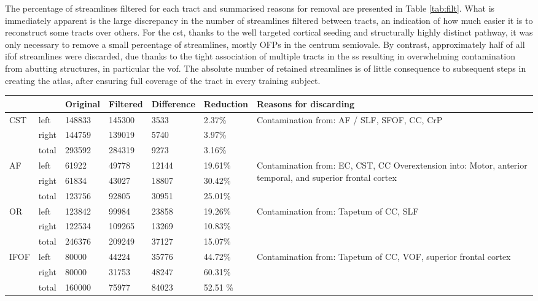 The percentage of streamlines filtered for each tract and summarised reasons for removal are presented in Table \ref{tab:filt}.
What is immediately apparent is the large discrepancy in the number of streamlines filtered between tracts, an indication of how much easier it is to reconstruct some tracts over others.
For the \gls{cst}, thanks to the well targeted cortical seeding and structurally highly distinct pathway, it was only necessary to remove a small percentage of streamlines, mostly OFPs in the centrum semiovale.
By contrast, approximately half of all \gls{ifof} streamlines were discarded, due thanks to the tight association of multiple tracts in the \gls{ss} resulting in overwhelming contamination from abutting structures, in particular the \gls{vof}.
The absolute number of retained streamlines is of little consequence to subsequent steps in creating the atlas, after ensuring full coverage of the tract in every training subject.

\begin{table*}[t]
  \caption{Streamline filtering statistics. Abbreviations: }
  \label{tab:filt}
  \small
  \begin{tabularx}{\textwidth}{llllll X}\toprule
   &  & Original & Filtered & Difference & Reduction & Reasons for discarding \\
   \midrule
  CST & left & 148833 & 145300 & 3533 & 2.37\% & \multirow{3}{=}{Contamination from: AF / SLF, SFOF, CC, CrP} \\
   & right & 144759 & 139019 & 5740 & 3.97\% &  \\
   & total & 293592 & 284319 & 9273 & 3.16\% &  \\ \addlinespace
  AF & left & 61922 & 49778 & 12144 & 19.61\% & \multirow{3}{=}{Contamination from:  EC, CST, CC Overextension into: Motor, anterior temporal, and superior frontal cortex} \\
   & right & 61834 & 43027 & 18807 & 30.42\% &  \\
   & total & 123756 & 92805 & 30951 & 25.01\% &  \\ \addlinespace
  OR & left & 123842 & 99984 & 23858 & 19.26\% & \multirow{3}{=}{Contamination from: Tapetum of CC, SLF} \\
   & right & 122534 & 109265 & 13269 & 10.83\% &  \\
   & total & 246376 & 209249 & 37127 & 15.07\% & \\ \addlinespace
  IFOF & left & 80000 & 44224 & 35776 & 44.72\% & \multirow{3}{=}{Contamination from: Tapetum of CC, VOF, superior frontal cortex} \\
   & right & 80000 & 31753 & 48247 & 60.31\% &  \\
   & total & 160000 & 75977 & 84023 & 52.51 \% & \\ \toprule
 \end{tabularx}
\end{table*}

